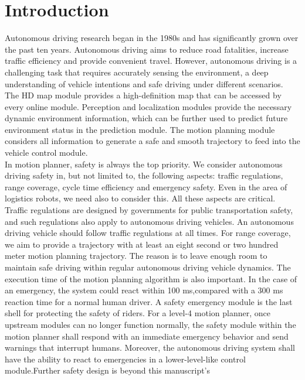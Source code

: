 \documentclass{thesisreport}
\begin{document}
 \chapter*{Introduction}
 Autonomous driving research began in the 1980s and has significantly grown over the past ten years. Autonomous driving aims to reduce road fatalities, increase traffic efficiency and provide convenient travel. However, autonomous driving is a challenging task that requires accurately sensing the environment, a deep understanding of vehicle intentions and safe driving under different scenarios.\\
 \indent
 The HD map module provides a
 high-definition map that can be accessed by every online module. Perception and localization modules provide the necessary dynamic environment information, which can be further used to predict future environment status in the prediction module. The motion planning module considers all information to generate a safe and smooth trajectory to feed into the vehicle control module.\\
 \indent
 In motion planner, safety is always the top priority. We consider autonomous driving safety in, but not limited to, the following aspects: traffic regulations, range coverage, cycle time efficiency and emergency safety. Even in the area of logistics robots, we need also to consider this. All these aspects are critical. Traffic regulations are designed by governments for public transportation safety, and such regulations also apply to autonomous driving vehicles. An autonomous driving vehicle should follow traffic regulations at all times. For range coverage, we aim to provide a trajectory with at least an eight second or two hundred meter motion planning trajectory. The reason is to leave enough room to maintain safe driving within regular autonomous driving vehicle dynamics. The execution time of the motion planning algorithm is also important. In the case of an emergency, the system could react within 100 ms,compared with a 300 ms reaction time for a normal human driver.
 A safety emergency module is the last shell for protecting the safety of riders. For a level-4 motion planner, once upstream modules can no longer function normally, the safety module within the motion planner shall respond with an immediate emergency behavior and send warnings that interrupt humans. Moreover, the autonomous driving system shall have the ability to react to emergencies in a lower-level-like control module.Further safety design is beyond this manuscript’s
\end{document}
